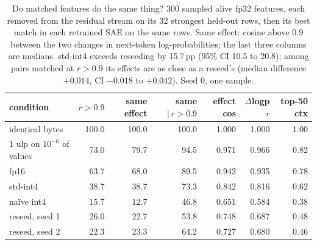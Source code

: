 \begin{table}[htbp]
\caption{Do matched features do the same thing? 300 sampled alive fp32 features, each removed from the residual stream on its 32 strongest held-out rows, then its best match in each retrained SAE on the same rows. Same effect: cosine above $0.9$ between the two changes in next-token log-probabilities; the last three columns are medians. std-int4 exceeds reseeding by 15.7\,pp (95\% CI 10.5 to 20.8); among pairs matched at $r > 0.9$ its effects are as close as a reseed's (median difference $+0.014$, CI $-0.018$ to $+0.042$). Seed 0, one sample.}
\label{tab:featablation}
\centering\small
\begin{tabular}{lrrrrrr}
\toprule
condition & $r > 0.9$ & same effect & same $|\,r > 0.9$ & effect cos & $\Delta$logp $r$ & top-50 ctx \\
\midrule
identical bytes & 100.0 & 100.0 & 100.0 & 1.000 & 1.000 & 1.00 \\
1 ulp on $10^{-6}$ of values & 73.0 & 79.7 & 94.5 & 0.971 & 0.966 & 0.82 \\
fp16 & 63.7 & 68.0 & 89.5 & 0.942 & 0.935 & 0.78 \\
std-int4 & 38.7 & 38.7 & 73.3 & 0.842 & 0.816 & 0.62 \\
na\"ive int4 & 15.7 & 12.7 & 46.8 & 0.651 & 0.584 & 0.38 \\
reseed, seed 1 & 26.0 & 22.7 & 53.8 & 0.748 & 0.687 & 0.48 \\
reseed, seed 2 & 22.3 & 23.3 & 64.2 & 0.727 & 0.680 & 0.46 \\
\bottomrule
\end{tabular}
\end{table}

